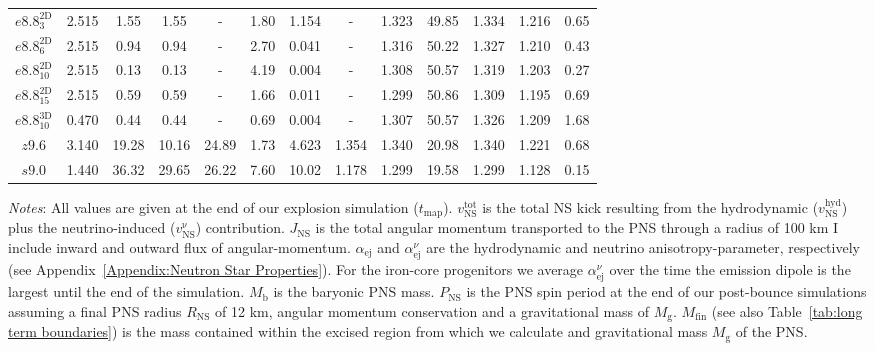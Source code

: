 \documentclass[fleqn,usenatbib]{mnras}
\newcommand{\GEO}[1]{{\color{red}#1}}
\newcommand{\COM}[1]{{\color{orange}#1}}
\begin{document}
\begin{table}
\begin{tabular}{cccccccccc||ccc}
    \hline
    $e8.8_{3}^{\mathrm{2D}}$ & 2.515 & 1.55  & 1.55  & -     & 1.80  & 1.154 &  -     & 1.323 &  49.85 &  1.334 &  1.216 &  0.65 \\
    $e8.8_{6}^{\mathrm{2D}}$ & 2.515 & 0.94  & 0.94  & -     & 2.70  & 0.041 &  -     & 1.316 &  50.22 &  1.327 &  1.210 &  0.43 \\
    $e8.8_{10}^{\mathrm{2D}}$& 2.515 & 0.13  & 0.13  & -     & 4.19  & 0.004 &  -     & 1.308 &  50.57 &  1.319 &  1.203 &  0.27 \\
    $e8.8_{15}^{\mathrm{2D}}$& 2.515 & 0.59  & 0.59  & -     & 1.66  & 0.011 &  -     & 1.299 &  50.86 &  1.309 &  1.195 &  0.69 \\
    $e8.8_{10}^{\mathrm{3D}}$& 0.470 & 0.44  & 0.44  & -     & 0.69  & 0.004 &  -     & 1.307 &  50.57 &  1.326 &  1.209 &  1.68  \\
    $z9.6$                   & 3.140 & 19.28 & 10.16 & 24.89 & 1.73  & 4.623 & 1.354  & 1.340 &  20.98 &  1.340 &  1.221 &  0.68 \\
    $s9.0$                   & 1.440 & 36.32 & 29.65 & 26.22 & 7.60  & 10.02 & 1.178  & 1.299 &  19.58 &  1.299 &  1.128 &  0.15  \\
    \hline
\end{tabular}
\flushleft
\textit{Notes}: \GEO{All values are given at the end of our explosion simulation ($t_{\mathrm{map}}$). $v_{\mathrm{NS}}^{\mathrm{tot}}$ is the total NS kick resulting from the hydrodynamic ($v_{\mathrm{NS}}^{\mathrm{hyd}}$) plus the neutrino-induced ($v_{\mathrm{NS}}^{\mathrm{\nu}}$) contribution. $J_{\mathrm{NS}}$ is the total angular momentum transported to the PNS through a radius of 100 km \COM{I include inward and outward flux of angular-momentum}. $\alpha_{\mathrm{ej}}$ and $\alpha_{\mathrm{ej}}^{\nu}$ are the hydrodynamic and neutrino anisotropy-parameter, respectively (see Appendix~\ref{Appendix:Neutron Star Properties}). For the iron-core progenitors we average $\alpha_{\mathrm{ej}}^{\nu}$ over the time the emission dipole is the largest until the end of the simulation. $M_{\mathrm{b}}$ is the baryonic PNS mass. $P_{\mathrm{NS}}$ is the PNS spin period at the end of our post-bounce simulations assuming a final PNS radius $R_{\mathrm{NS}}$ of 12 km, angular momentum conservation and a gravitational mass of $M_{\mathrm{g}}$. $M_{\mathrm{fin}}$ (see also Table~\ref{tab:long term boundaries}) is the mass contained within the excised region from which we calculate and gravitational mass $M_{\mathrm{g}}$ of the PNS. }
\end{table}
\end{document}
